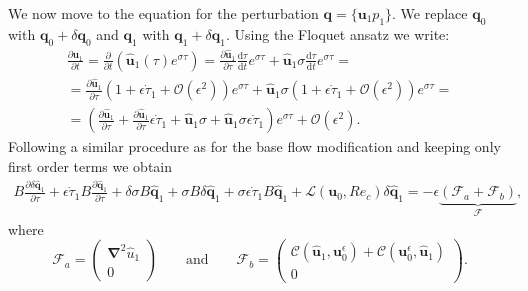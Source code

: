 We now move to the equation for the perturbation $\bm{q} = \{ \bm{u}_1 p_1 \}$. We replace $\bm{q}_0$ with $\bm{q}_0 + \delta \bm{q}_0$ and $\bm{q}_1$ with $\bm{q}_1 + \delta \bm{q}_1$. Using the Floquet ansatz we write:
%
\begin{equation}
  \begin{gathered}
  \frac{\partial \bm{u}_1}{\partial t} = \frac{\partial}{\partial t} \left( \hat{\bm{u}}_1(\tau) e^{\sigma \tau} \right) = 
  \frac{\partial \hat{\bm{u}}_1}{\partial \tau} \frac{\text{d} \tau}{\text{d} t} e^{\sigma \tau} +
  \hat{\bm{u}}_1 \sigma \frac{\text{d} \tau}{\text{d} t} e^{\sigma \tau} = \\
  = \frac{\partial \hat{\bm{u}}_1}{\partial \tau} \left( 1 + \epsilon \dot{\tau}_1 +  \mathcal{O}(\epsilon^2) \right) e^{\sigma \tau} +
  \hat{\bm{u}}_1 \sigma ( 1 + \epsilon \dot{\tau}_1 + \mathcal{O}(\epsilon^2) ) e^{\sigma \tau} = \\
 = \left( \frac{\partial \hat{\bm{u}}_1}{\partial \tau} + \frac{\partial \hat{\bm{u}}_1}{\partial \tau} \epsilon \dot{\tau}_1 + \hat{\bm{u}}_1 \sigma + \hat{\bm{u}}_1 \sigma \epsilon \dot{\tau}_1 \right) e^{\sigma \tau} + \mathcal{O}(\epsilon^2).
  \end{gathered}
\end{equation}
Following a similar procedure as for the base flow modification and keeping only first order terms we obtain
%
\begin{equation}
  \begin{gathered}
  B \frac{\partial \delta \hat{\bm{q}}_1}{\partial \tau} +
  \epsilon \dot{\tau}_1 B \frac{ \partial \hat{\bm{q}}_1 }{\partial \tau} +
  \delta \sigma B \hat{\bm{q}}_1 +
  \sigma B \delta \hat{\bm{q}}_1 + 
  \sigma \epsilon \dot{\tau}_1 B \hat{\bm{q}}_1 +
  \mathcal{L}(\bm{u}_0,Re_c) \delta \hat{\bm{q}}_1 = -\epsilon \underbrace{ \left( \mathcal{F}_{a} + \mathcal{F}_{b} \right) }_{\mathcal{F}},
  \end{gathered}
\end{equation}
%
where
%
\begin{equation}
  \mathcal{F}_{a} = \begin{pmatrix} \bm{\nabla}^2 \hat{u}_1 \\ 0 \end{pmatrix}
  \qquad \text{and} \qquad
  \mathcal{F}_{b} = \begin{pmatrix} \mathcal{C}(\hat{\bm{u}}_1,\bm{u}_0^\epsilon) + \mathcal{C}(\bm{u}_0^\epsilon,\hat{\bm{u}}_1) \\ 0 \end{pmatrix}.
\end{equation}

